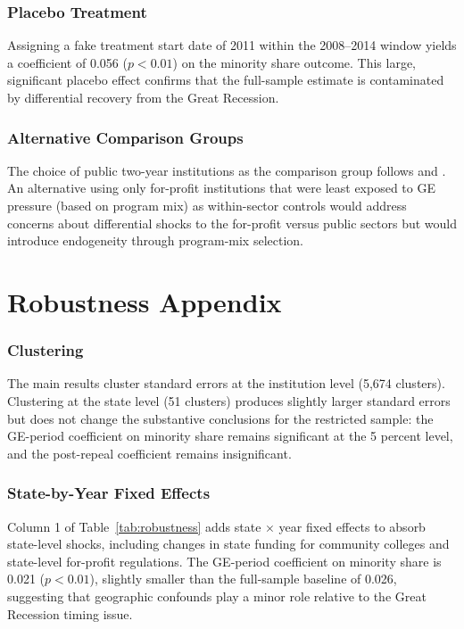 \documentclass[12pt]{article}
\begin{document}
\subsubsection*{Placebo Treatment} Assigning a fake treatment start date of 2011 within the 2008--2014 window yields a coefficient of 0.056 ($p < 0.01$) on the minority share outcome. This large, significant placebo effect confirms that the full-sample estimate is contaminated by differential recovery from the Great Recession.

\subsubsection*{Alternative Comparison Groups} The choice of public two-year institutions as the comparison group follows \citet{DemingGoldinKatz2012} and \citet{Cellini2020}. An alternative using only for-profit institutions that were least exposed to GE pressure (based on program mix) as within-sector controls would address concerns about differential shocks to the for-profit versus public sectors but would introduce endogeneity through program-mix selection.


\section{Robustness Appendix}
\label{sec:robust_appendix}

\subsubsection*{Clustering} The main results cluster standard errors at the institution level (5,674 clusters). Clustering at the state level (51 clusters) produces slightly larger standard errors but does not change the substantive conclusions for the restricted sample: the GE-period coefficient on minority share remains significant at the 5 percent level, and the post-repeal coefficient remains insignificant.

\subsubsection*{State-by-Year Fixed Effects} Column 1 of Table~\ref{tab:robustness} adds state $\times$ year fixed effects to absorb state-level shocks, including changes in state funding for community colleges and state-level for-profit regulations. The GE-period coefficient on minority share is 0.021 ($p < 0.01$), slightly smaller than the full-sample baseline of 0.026, suggesting that geographic confounds play a minor role relative to the Great Recession timing issue.
\end{document}
